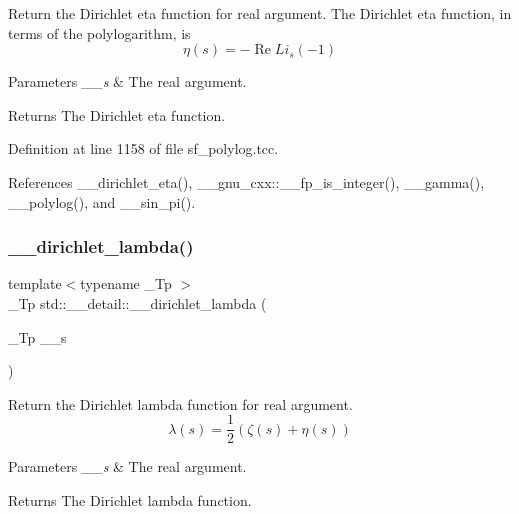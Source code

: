 Return the Dirichlet eta function for real argument. The Dirichlet eta function, in terms of the polylogarithm, is \[ \renewcommand\Re{\operatorname{Re}} \renewcommand\Im{\operatorname{Im}} \eta(s) = -\Re{Li_s(-1)} \]


\begin{DoxyParams}{Parameters}
{\em \+\_\+\+\_\+s} & The real argument. \\
\hline
\end{DoxyParams}
\begin{DoxyReturn}{Returns}
The Dirichlet eta function. 
\end{DoxyReturn}


Definition at line 1158 of file sf\+\_\+polylog.\+tcc.



References \+\_\+\+\_\+dirichlet\+\_\+eta(), \+\_\+\+\_\+gnu\+\_\+cxx\+::\+\_\+\+\_\+fp\+\_\+is\+\_\+integer(), \+\_\+\+\_\+gamma(), \+\_\+\+\_\+polylog(), and \+\_\+\+\_\+sin\+\_\+pi().

\mbox{\label{namespacestd_1_1____detail_a6ee8ae93ba65207de8ef3d6bb162b192}} 
\subsubsection{\texorpdfstring{\+\_\+\+\_\+dirichlet\+\_\+lambda()}{\_\_dirichlet\_lambda()}}
{\footnotesize\ttfamily template$<$typename \+\_\+\+Tp $>$ \\
\+\_\+\+Tp std\+::\+\_\+\+\_\+detail\+::\+\_\+\+\_\+dirichlet\+\_\+lambda (\begin{DoxyParamCaption}\item[{\+\_\+\+Tp}]{\+\_\+\+\_\+s }\end{DoxyParamCaption})}

Return the Dirichlet lambda function for real argument. \[ \lambda(s) = \frac{1}{2}(\zeta(s) + \eta(s)) \]


\begin{DoxyParams}{Parameters}
{\em \+\_\+\+\_\+s} & The real argument. \\
\hline
\end{DoxyParams}
\begin{DoxyReturn}{Returns}
The Dirichlet lambda function. 
\end{DoxyReturn}


